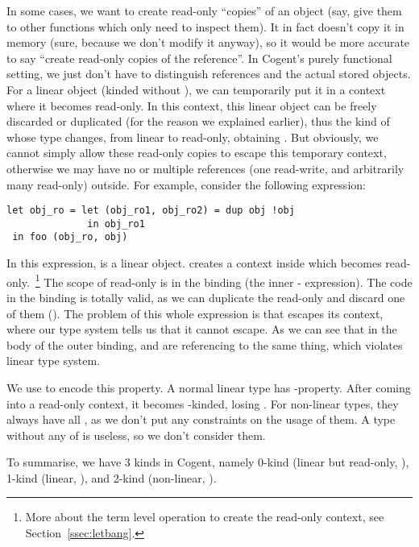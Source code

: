 \documentclass[a4paper]{article}
\newcommand{\cogent}{Cogent\xspace}
\begin{document}
In some cases, we want to create read-only ``copies'' of an object (say, give them to other functions which only need to inspect them).
It in fact doesn't copy it in memory (sure, because we don't modify it anyway), so it would be more accurate to say ``create read-only
copies of the reference''. In \cogent's purely functional setting, we just don't have to distinguish references and the actual stored objects.
For a linear object (kinded without ), we can temporarily put it in a context where it becomes read-only. In this context, this
linear object can be freely discarded or duplicated (for the reason we explained earlier), thus the kind of whose type changes, 
from linear to read-only, obtaining . But obviously, we cannot simply allow these read-only copies to escape
this temporary context, otherwise we may have no or multiple references (one read-write, and arbitrarily many read-only) outside. For
example, consider the following expression:
\begin{lstlisting}[language=Cogent]
let obj_ro = let (obj_ro1, obj_ro2) = dup obj !obj
              in obj_ro1
 in foo (obj_ro, obj)
\end{lstlisting}
In this expression,  is a linear object.  creates a context inside which  becomes read-only.~\footnote{More 
about the term level operation to create the read-only context, see Section~\ref{ssec:letbang}.}
The scope of read-only  is in the binding (the inner - expression). The code in the binding is totally
valid, as we can duplicate the read-only  and discard one of them (). The problem of this whole expression
is that  escapes its context, where our type system tells us that it cannot escape. As we can see that in
the body of the outer binding,  and  are referencing to the same thing, which violates linear type system.

We use  to encode this property. A normal
linear type has -property. After coming into a read-only context, it becomes -kinded, losing . For non-linear types,
they always have all , as we don't put any constraints on the usage of them. A type without any of  is useless, so
we don't consider them. 

To summarise, we have 3 kinds in \cogent, namely 0-kind (linear but read-only, ), 
1-kind (linear, ), and 2-kind (non-linear, ).
\end{document}
